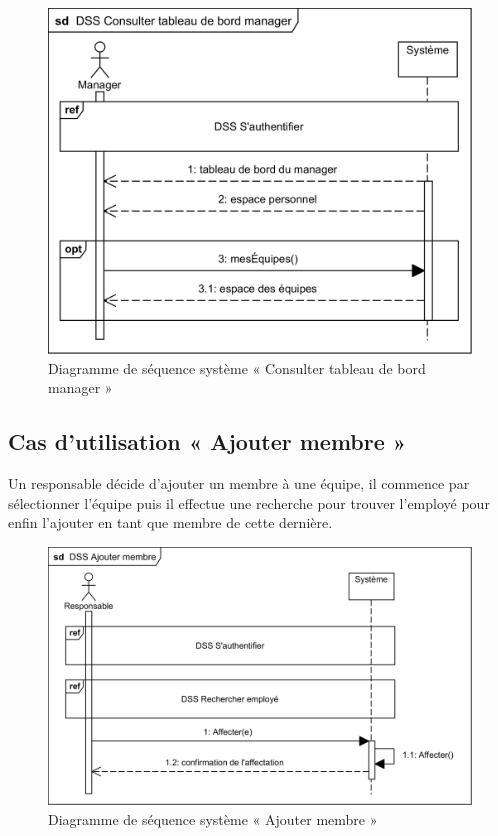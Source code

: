 \begin{figure}[h!]
     \centering
    \includegraphics[scale=1]{images/DSS/DSS Consulter tableau de bord manager.png}
     \caption{Diagramme de séquence système « Consulter tableau de bord manager »}
     \label{fig4}
\end{figure}

\vspace{-30pt}
\subsection{Cas d'utilisation « Ajouter membre »}
Un responsable décide d’ajouter un membre à une équipe, il commence par
sélectionner l’équipe puis il effectue une recherche pour trouver l’employé pour
enfin l’ajouter en tant que membre de cette dernière.  

\begin{figure}[h!]
     \centering
    \includegraphics[scale=1]{images/DSS/DSS Ajouter membre.png}
     \caption{Diagramme de séquence système « Ajouter membre »}
     \label{fig4}
\end{figure}
    
